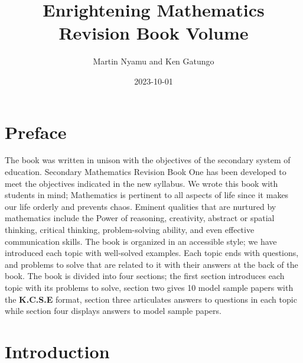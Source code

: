 \documentclass[
  letterpaper,
  DIV=11,
  numbers=noendperiod]{scrreprt}
\title{Enrightening Mathematics Revision Book Volume}
\author{Martin Nyamu and Ken Gatungo}
\date{2023-10-01}
\renewcommand*\contentsname{Table of contents}
\newcommand\contentsname{Table of contents}
\begin{document}
\maketitle
\ifdefined\Shaded\renewenvironment{Shaded}{\begin{tcolorbox}[boxrule=0pt, interior hidden, borderline west={3pt}{0pt}{shadecolor}, enhanced, breakable, sharp corners, frame hidden]}{\end{tcolorbox}}\fi

\renewcommand*\contentsname{Table of contents}
{
\hypersetup{linkcolor=}
\setcounter{tocdepth}{2}
\tableofcontents
}

\hypertarget{preface}{%
\chapter*{Preface}\label{preface}}


The book was written in unison with the objectives of the secondary
system of education. Secondary Mathematics Revision Book One has been
developed to meet the objectives indicated in the new syllabus. We wrote
this book with students in mind; Mathematics is pertinent to all aspects
of life since it makes our life orderly and prevents chaos. Eminent
qualities that are nurtured by mathematics include the Power of
reasoning, creativity, abstract or spatial thinking, critical thinking,
problem-solving ability, and even effective communication skills. The
book is organized in an accessible style; we have introduced each topic
with well-solved examples. Each topic ends with questions, and problems
to solve that are related to it with their answers at the back of the
book. The book is divided into four sections; the first section
introduces each topic with its problems to solve, section two gives 10
model sample papers with the \textbf{K.C.S.E} format, section three
articulates answers to questions in each topic while section four
displays answers to model sample papers.


\hypertarget{introduction}{%
\chapter*{Introduction}\label{introduction}}

\end{document}
